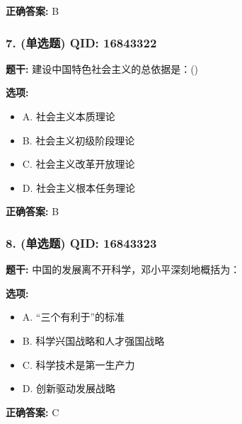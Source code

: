 \documentclass[12pt,UTF8]{ctexart}
\begin{document}
\textbf{正确答案:}
B

\vspace{0.3em}\hrulefill\vspace{0.7em}

\subsubsection*{7. (单选题) \small QID: 16843322}

\textbf{题干:}
建设中国特色社会主义的总依据是：()

\textbf{选项:}
\begin{itemize}[leftmargin=*]

  \item A. 社会主义本质理论

  \item B. 社会主义初级阶段理论

  \item C. 社会主义改革开放理论

  \item D. 社会主义根本任务理论

\end{itemize}

\textbf{正确答案:}
B

\vspace{0.3em}\hrulefill\vspace{0.7em}

\subsubsection*{8. (单选题) \small QID: 16843323}

\textbf{题干:}
中国的发展离不开科学，邓小平深刻地概括为：

\textbf{选项:}
\begin{itemize}[leftmargin=*]

  \item A. “三个有利于”的标准

  \item B. 科学兴国战略和人才强国战略

  \item C. 科学技术是第一生产力

  \item D. 创新驱动发展战略

\end{itemize}

\textbf{正确答案:}
C

\vspace{0.3em}\hrulefill\vspace{0.7em}
\end{document}
